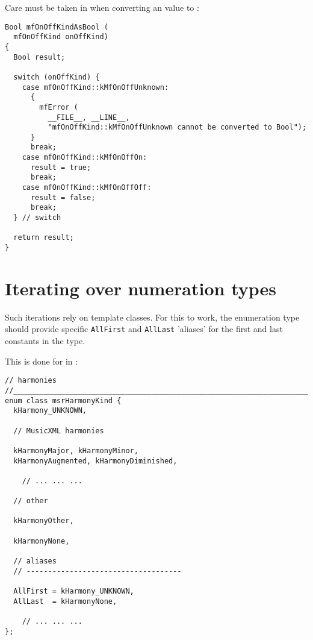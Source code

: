 Care must be taken in  when converting an  value to :
\begin{lstlisting}[language=Terminal]
Bool mfOnOffKindAsBool (
  mfOnOffKind onOffKind)
{
  Bool result;

  switch (onOffKind) {
    case mfOnOffKind::kMfOnOffUnknown:
      {
        mfError (
          __FILE__, __LINE__,
          "mfOnOffKind::kMfOnOffUnknown cannot be converted to Bool");
      }
      break;
    case mfOnOffKind::kMfOnOffOn:
      result = true;
      break;
    case mfOnOffKind::kMfOnOffOff:
      result = false;
      break;
  } // switch

  return result;
}
\end{lstlisting}


\section{Iterating over numeration types}

Such iterations rely on template classes. For this to work, the enumeration type should provide specific {\tt AllFirst} and {\tt AllLast} 'aliases' for the first and last constants in the type.

This is done for  in :
\begin{lstlisting}[language=CPlusPlus]
// harmonies
//______________________________________________________________________________
enum class msrHarmonyKind {
  kHarmony_UNKNOWN,

  // MusicXML harmonies

  kHarmonyMajor, kHarmonyMinor,
  kHarmonyAugmented, kHarmonyDiminished,

	// ... ... ...

  // other

  kHarmonyOther,

  kHarmonyNone,

  // aliases
  // ------------------------------------

  AllFirst = kHarmony_UNKNOWN,
  AllLast  = kHarmonyNone,

	// ... ... ...
};
\end{lstlisting}

